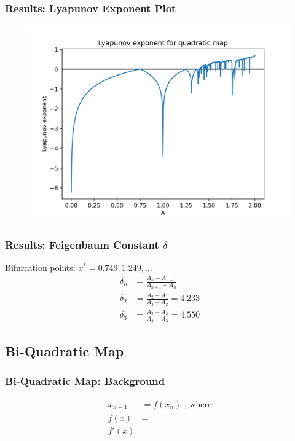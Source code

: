 \documentclass[
	11pt, %
	aspectratio=169, %
]{beamer}
\begin{document}

\begin{frame}
        \frametitle{Results: Lyapunov Exponent Plot}
        \begin{figure}
            \includegraphics[width=0.6\linewidth]
            {quadratic_lyapunov_exp.png}
        \end{figure}
\end{frame}


\begin{frame}
    \frametitle{Results: Feigenbaum Constant $\delta$}
    Bifurcation points: $x^* = 0.749, 1.249, \dots$ \pause
    \begin{align*}
        \delta_{n} &= \frac{A_{n}-A_{n-1}}{A_{n+1}-A_{n}} \\
        \delta_{2} &= \frac{A_{2}-A_{1}}{A_{3}-A_{2}} = 4.233 \\
        \delta_{3} &= \frac{A_{3}-A_{2}}{A_{4}-A_{3}} = 4.550
    \end{align*}
\end{frame}


\subsection{Bi-Quadratic Map}

\begin{frame}
        \frametitle{Bi-Quadratic Map: Background}
        \begin{align*}
            x_{n+1} &= f(x_n) \text{ , where}\\
            f(x) &=  \\
            f'(x) &= 
        \end{align*}
\end{frame}
\end{document}
